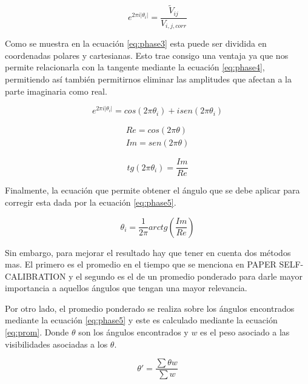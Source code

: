 \begin{equation}
    e^{2\pi i|\theta_{i}|}= \frac{\tilde{V}_{ij}}{V_{i,j,corr}}
    \label{eq:phase2}
\end{equation}

Como se muestra en la ecuación \ref{eq:phase3} esta puede ser dividida en coordenadas polares y cartesianas. Esto trae consigo una ventaja ya que nos permite relacionarla con la tangente mediante la ecuación \ref{eq:phase4}, permitiendo así también permitirnos eliminar las amplitudes que afectan a la parte imaginaria como real. 

\begin{equation}
    e^{2\pi i|\theta_{i}|} =  cos(2 \pi \theta_i) + i  sen(2 \pi \theta_i) 
    \label{eq:phase3}
\end{equation}

\begin{align} 
Re = cos(2 \pi \theta)\\ 
Im = sen(2 \pi \theta)
\end{align}


\begin{equation}
    tg(2\pi \theta_i) = \frac{Im}{Re}
    \label{eq:phase4}
\end{equation}

Finalmente, la ecuación que permite obtener el ángulo que se debe aplicar para corregir esta dada por la ecuación \ref{eq:phase5}.

\begin{equation}
    \theta_{i} = \frac{1}{2\pi}arctg(\frac{Im}{Re})
    \label{eq:phase5}
\end{equation}

Sin embargo, para mejorar el resultado hay que tener en cuenta dos métodos mas. El primero es el promedio en el tiempo que se menciona en PAPER SELF-CALIBRATION y el segundo es el de un promedio ponderado para darle mayor importancia a aquellos ángulos que tengan una mayor relevancia. 







Por otro lado, el promedio ponderado se realiza sobre los ángulos encontrados mediante la ecuación \ref{eq:phase5} y este es calculado mediante la ecuación \ref{eq:prom}. Donde $\theta$ son los ángulos encontrados y $w$ es el peso asociado a las visibilidades asociadas a los $\theta$.

\begin{equation}
    \theta' = \frac{\sum \theta w}{\sum w}
    \label{eq:prom}
\end{equation}

